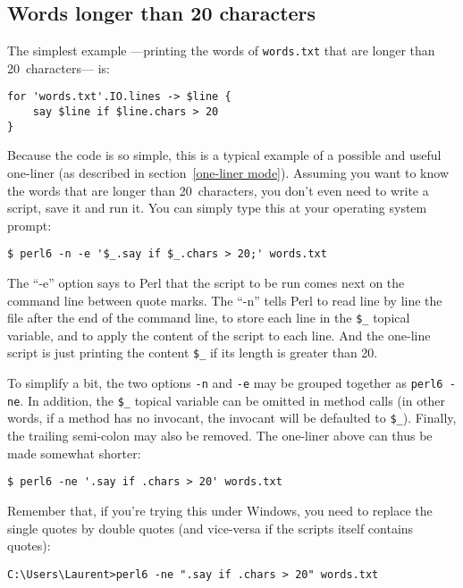 \subsection{Words longer than 20 characters}

The simplest example ---printing the words of 
{\tt words.txt} that are longer than 20~characters---  is:

\begin{verbatim}
for 'words.txt'.IO.lines -> $line {
    say $line if $line.chars > 20
}
\end{verbatim}
%

Because the code is so simple, this is a typical example 
of a possible and useful one-liner (as described in 
section~\ref{one-liner mode}). Assuming you want to know the words 
that are longer than 20~characters, you don't even need to 
write a script, save it and run it. You can simply type this at 
your operating system prompt:
\label{one-liner example}

\begin{verbatim}
$ perl6 -n -e '$_.say if $_.chars > 20;' words.txt
\end{verbatim} 
%
The ``-e'' option says to Perl that the script to be run 
comes next on the command line between quote marks. The 
``-n'' tells Perl to read line by line the file after the 
end of the command line, to store each line in the \verb'$_' 
topical variable, and to apply the content of the script to 
each line. And the one-line script is just printing the 
content  \verb'$_' if its length is greater than 20.

To simplify a bit, the two options \verb'-n' and \verb'-e' 
may be grouped together as \verb"perl6 -ne". In addition, 
the \verb'$_' topical variable can be omitted in method calls 
(in other words, if a method has no invocant, the invocant 
will be defaulted to \verb'$_'). Finally, the trailing 
semi-colon may also be removed. The one-liner above can 
thus be made somewhat shorter:

\begin{verbatim}
$ perl6 -ne '.say if .chars > 20' words.txt
\end{verbatim} 
%
Remember that, if you're trying this under Windows, you need to 
replace the single quotes by double quotes (and vice-versa if 
the scripts itself contains quotes):

\begin{verbatim}
C:\Users\Laurent>perl6 -ne ".say if .chars > 20" words.txt
\end{verbatim} 
%

